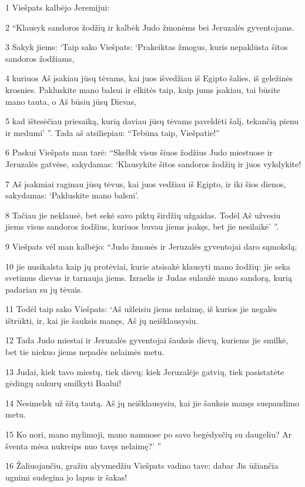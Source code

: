 \par 1 Viešpats kalbėjo Jeremijui: 
\par 2 “Klausyk sandoros žodžių ir kalbėk Judo žmonėms bei Jeruzalės gyventojams. 
\par 3 Sakyk jiems: ‘Taip sako Viešpats: ‘Prakeiktas žmogus, kuris nepaklūsta šitos sandoros žodžiams, 
\par 4 kuriuos Aš įsakiau jūsų tėvams, kai juos išvedžiau iš Egipto šalies, iš geležinės krosnies. Pakluskite mano balsui ir elkitės taip, kaip jums įsakiau, tai būsite mano tauta, o Aš būsiu jūsų Dievas, 
\par 5 kad ištesėčiau priesaiką, kurią daviau jūsų tėvams paveldėti šalį, tekančią pienu ir medumi’ ”. Tada aš atsiliepiau: “Tebūna taip, Viešpatie!” 
\par 6 Paskui Viešpats man tarė: “Skelbk visus šiuos žodžius Judo miestuose ir Jeruzalės gatvėse, sakydamas: ‘Klausykite šitos sandoros žodžių ir juos vykdykite! 
\par 7 Aš įsakmiai raginau jūsų tėvus, kai juos vedžiau iš Egipto, ir iki šios dienos, sakydamas: ‘Pakluskite mano balsui’. 
\par 8 Tačiau jie neklausė, bet sekė savo piktų širdžių užgaidas. Todėl Aš užvesiu jiems visus sandoros žodžius, kuriuos buvau jiems įsakęs, bet jie nesilaikė’ ”. 
\par 9 Viešpats vėl man kalbėjo: “Judo žmonės ir Jeruzalės gyventojai daro sąmokslą; 
\par 10 jie nusikalsta kaip jų protėviai, kurie atsisakė klausyti mano žodžių: jie seka svetimus dievus ir tarnauja jiems. Izraelis ir Judas sulaužė mano sandorą, kurią padariau su jų tėvais. 
\par 11 Todėl taip sako Viešpats: ‘Aš užleisiu jiems nelaimę, iš kurios jie negalės ištrūkti, ir, kai jie šauksis manęs, Aš jų neišklausysiu. 
\par 12 Tada Judo miestai ir Jeruzalės gyventojai šauksis dievų, kuriems jie smilkė, bet tie niekuo jiems nepadės nelaimės metu. 
\par 13 Judai, kiek tavo miestų, tiek dievų; kiek Jeruzalėje gatvių, tiek pasistatėte gėdingų aukurų smilkyti Baalui! 
\par 14 Nesimelsk už šitą tautą. Aš jų neišklausysiu, kai jie šauksis manęs suspaudimo metu. 
\par 15 Ko nori, mano mylimoji, mano namuose po savo begėdysčių su daugeliu? Ar šventa mėsa nukreips nuo tavęs nelaimę?’ ” 
\par 16 Žaliuojančiu, gražiu alyvmedžiu Viešpats vadino tave; dabar Jis ūžiančia ugnimi sudegina jo lapus ir šakas! 
